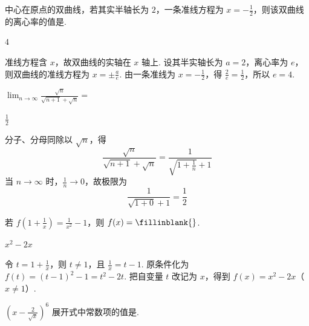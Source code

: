 \begin{problem}

中心在原点的双曲线，若其实半轴长为 \(2\)，一条准线方程为 \(x = -\frac{1}{2}\)，则该双曲线的离心率的值是\fillinblank{}.
\end{problem}

\begin{answer}
\(4\)
\end{answer}

\begin{solution}
准线方程含 \(x\)，故双曲线的实轴在 \(x\) 轴上. 设其半实轴长为 \(a=2\)，离心率为 \(e\)，则双曲线的准线方程为 \(x=\pm\frac{a}{e}\). 由一条准线为 \(x=-\frac{1}{2}\)，得 \(\frac{2}{e}=\frac{1}{2}\)，所以 \(e=4\).
\end{solution}


\begin{problem}
\(\displaystyle\lim_{n\to \infty}\frac{\sqrt{n}}{\sqrt{n + 1} + \sqrt{n}} =\)\fillinblank{}
\end{problem}

\begin{answer}
\(\frac{1}{2}\)
\end{answer}

\begin{solution}
分子、分母同除以 \(\sqrt n\)，得
\[
\frac{\sqrt n}{\sqrt{n+1}+\sqrt n}
=\frac{1}{\sqrt{1+\frac{1}{n}}+1}
\]
当 \(n\to\infty\) 时，\(\frac{1}{n}\to0\)，故极限为
\[
\frac{1}{\sqrt{1+0}+1}=\frac{1}{2}
\]
\end{solution}


\begin{problem}

若 \(f\left(1 + \frac{1}{x}\right) = \frac{1}{x^2} - 1 \)，则 \(f(x) =\fillinblank{}\).
\end{problem}

\begin{answer}
\(x^{2} - 2x\)
\end{answer}

\begin{solution}
令 \(t=1+\frac{1}{x}\)，则 \(t\ne1\)，且 \(\frac{1}{x}=t-1\). 原条件化为 \(f(t)=(t-1)^2-1=t^2-2t\). 把自变量 \(t\) 改记为 \(x\)，得到 \(f(x)=x^2-2x\)（\(x\ne1\)）.
\end{solution}


\begin{problem}

\(\left(x - \frac{2}{\sqrt{x}}\right)^6\) 展开式中常数项的值是\fillinblank{}.
\end{problem}

